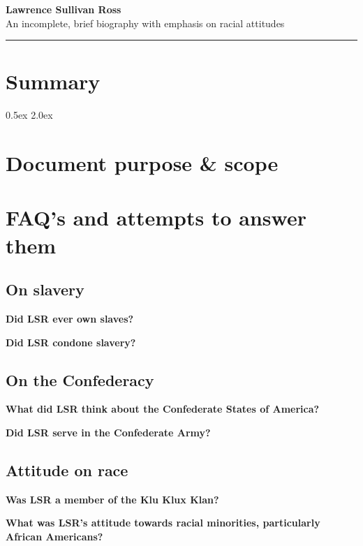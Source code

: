 \documentclass[12pt]{article}
\begin{document}
\Large{\textbf{Lawrence Sullivan Ross \\}}
\large{An incomplete, brief biography with emphasis on racial attitudes \\}
\rule{\textwidth}{1pt}

\section{Summary}

\parskip 0.5ex
\newpage
\tableofcontents
\parskip 2.0ex

\newpage
\section{Document purpose \& scope}

\newpage
\section{FAQ's and attempts to answer them}

\subsection{On slavery}
\textbf{Did LSR ever own slaves? \\}

\textbf{Did LSR condone slavery? \\}

\subsection{On the Confederacy}
\textbf{What did LSR think about the Confederate States of America? \\}

\textbf{Did LSR serve in the Confederate Army? \\}

\subsection{Attitude on race}
\textbf{Was LSR a member of the Klu Klux Klan? \\}

\textbf{What was LSR's attitude towards racial minorities, particularly African Americans? \\}
\end{document}
